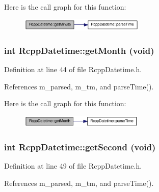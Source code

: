 Here is the call graph for this function:\nopagebreak
\begin{figure}[H]
\begin{center}
\leavevmode
\includegraphics[width=168pt]{classRcppDatetime_adb41bd524ead66d69e129b1f2767358a_cgraph}
\end{center}
\end{figure}
\hypertarget{classRcppDatetime_aa7f04947d2a27e4bba2d19efa21771ed}{
\subsubsection[{getMonth}]{\setlength{\rightskip}{0pt plus 5cm}int RcppDatetime::getMonth (void)}}
\label{classRcppDatetime_aa7f04947d2a27e4bba2d19efa21771ed}


Definition at line 44 of file RcppDatetime.h.

References m\_\-parsed, m\_\-tm, and parseTime().

Here is the call graph for this function:\nopagebreak
\begin{figure}[H]
\begin{center}
\leavevmode
\includegraphics[width=167pt]{classRcppDatetime_aa7f04947d2a27e4bba2d19efa21771ed_cgraph}
\end{center}
\end{figure}
\hypertarget{classRcppDatetime_a2feb900005890d183cc5f6a626c4d614}{
\subsubsection[{getSecond}]{\setlength{\rightskip}{0pt plus 5cm}int RcppDatetime::getSecond (void)}}
\label{classRcppDatetime_a2feb900005890d183cc5f6a626c4d614}


Definition at line 49 of file RcppDatetime.h.

References m\_\-parsed, m\_\-tm, and parseTime().

